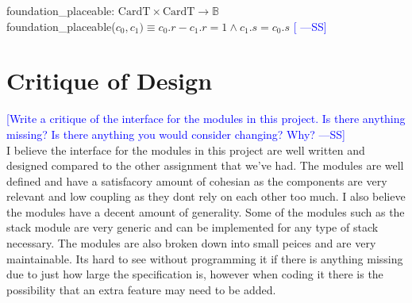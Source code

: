 \documentclass[12pt]{article}
\newcommand{\authornote}[3]{\textcolor{#1}{[#3 ---#2]}}
\newcommand{\authornote}[3]{}
\newcommand{\wss}[1]{\authornote{blue}{SS}{#1}}
\begin{document}
\noindent foundation\_placeable: $\text{CardT} \times \text{CardT} \rightarrow \mathbb{B}$ \\
\noindent foundation\_placeable($c_0,c_1)\equiv c_0.r - c_1.r = 1 \land c_1.s = c_0.s$ \wss{}

\newpage

\section*{Critique of Design}

\wss{Write a critique of the interface for the modules in this project.  Is there
anything missing?  Is there anything you would consider changing?  Why?}\\
  I believe the interface for the modules in this project are well written and designed compared to the other assignment that we've had.
  The modules are well defined and have a satisfacory amount of cohesian as the components are very relevant and low coupling as they dont rely on each other too much.
  I also believe the modules have a decent amount of generality. Some of the modules such as the stack module are very generic and can be implemented for
  any type of stack necessary. The modules are also broken down into small peices and are very maintainable. Its hard to see without programming it if there is
  anything missing due to just how large the specification is, however when coding it there is the possibility that an extra feature may need to be added.
\end{document}

